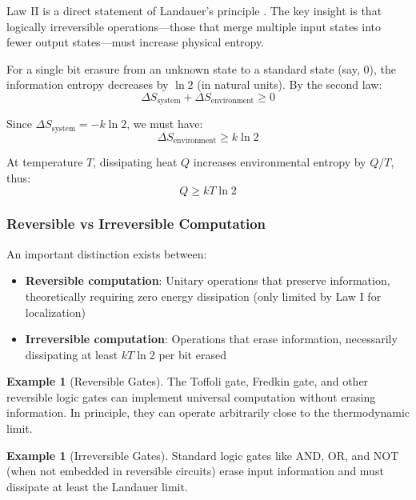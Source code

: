 \documentclass[11pt,a4paper]{article}
\theoremstyle{plain}
\theoremstyle{definition}
\newtheorem{example}[theorem]{Example}
\theoremstyle{remark}
\begin{document}
Law II is a direct statement of Landauer's principle \cite{landauer1961irreversibility}. The key insight is that logically irreversible operations—those that merge multiple input states into fewer output states—must increase physical entropy.

For a single bit erasure from an unknown state to a standard state (say, $0$), the information entropy decreases by $\ln 2$ (in natural units). By the second law:
\begin{equation}
\Delta S_{\text{system}} + \Delta S_{\text{environment}} \geq 0
\end{equation}

Since $\Delta S_{\text{system}} = -k\ln 2$, we must have:
\begin{equation}
\Delta S_{\text{environment}} \geq k\ln 2
\end{equation}

At temperature $T$, dissipating heat $Q$ increases environmental entropy by $Q/T$, thus:
\begin{equation}
Q \geq kT\ln 2
\end{equation}

\subsubsection{Reversible vs Irreversible Computation}

An important distinction exists between:

\begin{itemize}[leftmargin=*]
\item \textbf{Reversible computation}: Unitary operations that preserve information, theoretically requiring zero energy dissipation (only limited by Law I for localization)
\item \textbf{Irreversible computation}: Operations that erase information, necessarily dissipating at least $kT\ln 2$ per bit erased
\end{itemize}

\begin{example}[Reversible Gates]
The Toffoli gate, Fredkin gate, and other reversible logic gates can implement universal computation without erasing information. In principle, they can operate arbitrarily close to the thermodynamic limit.
\end{example}

\begin{example}[Irreversible Gates]
Standard logic gates like AND, OR, and NOT (when not embedded in reversible circuits) erase input information and must dissipate at least the Landauer limit.
\end{example}
\end{document}
